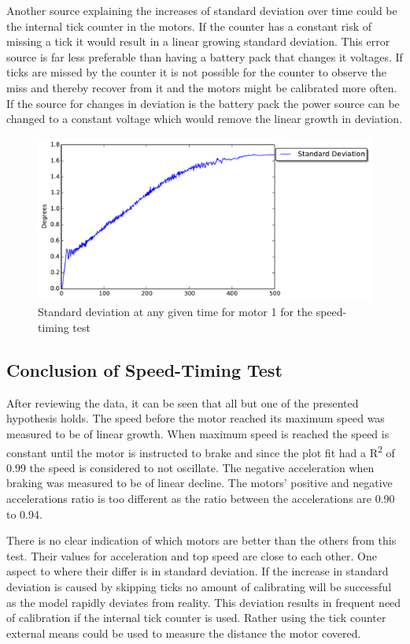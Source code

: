 Another source explaining the increases of standard deviation over time could be the internal tick counter in the motors. If the counter has a constant risk of missing a tick it would result in a linear growing standard deviation. This error source is far less preferable than having a battery pack that changes it voltages. If ticks are missed by the counter it is not possible for the counter to observe the miss and thereby recover from it and the motors might be calibrated more often. If the source for changes in deviation is the battery pack the power source can be changed to a constant voltage which would remove the linear growth in deviation.

\begin{figure}[!htb]
    \centering
	\includegraphics[width=1\textwidth]{test_res/speed_tests/StandardDeviation_motor_1.pdf}
     \caption{Standard deviation at any given time for motor 1 for the speed-timing test}
	\label{fig:standard_1}
\end{figure}

\subsection{Conclusion of Speed-Timing Test}\label{subsec:con_speed}
After reviewing the data, it can be seen that all but one of the presented hypothesis holds. The speed before the motor reached its maximum speed was measured to be of linear growth. When maximum speed is reached the speed is constant until the motor is instructed to brake and since the plot fit had a R\textsuperscript{2} of 0.99 the speed is considered to not oscillate. The negative acceleration when braking was measured to be of linear decline. The motors' positive and negative accelerations ratio is too different as the ratio between the accelerations are 0.90 to 0.94.

There is no clear indication of which motors are better than the others from this test. Their values for acceleration and top speed are close to each other. One aspect to where their differ is in standard deviation. If the increase in standard deviation is caused by skipping ticks no amount of calibrating will be successful as the model rapidly deviates from reality. This deviation results in frequent need of calibration if the internal tick counter is used. Rather using the tick counter external means could be used to measure the distance the motor covered.

